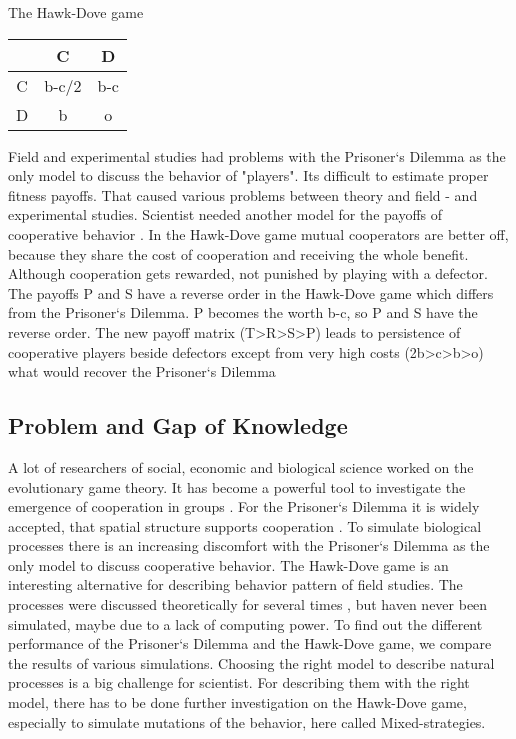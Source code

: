 The Hawk-Dove game

\begin{tabular}{|c|c|c|}
	\hline  & C & D \\ 
	\hline C & b-c/2 & b-c \\ 
	\hline D & b & o \\ 
	\hline 
\end{tabular} 
 
Field and experimental studies had problems with the Prisoner`s Dilemma as the only model to discuss the behavior of "players". Its difficult to estimate proper fitness payoffs. That caused various problems between theory and field -  and experimental studies. Scientist needed another model for the payoffs of cooperative behavior \citep{newmark1996}. In the Hawk-Dove game mutual cooperators are better off, because they share the cost of cooperation and receiving the whole benefit. Although cooperation gets rewarded, not punished by playing with a defector. The payoffs P and S have a reverse order in the Hawk-Dove game which differs from the Prisoner`s Dilemma. P becomes the worth b-c, so P and S have the reverse order. The new payoff matrix (T>R>S>P) leads to persistence of cooperative players beside defectors except from very high costs (2b>c>b>o) what would recover the Prisoner`s Dilemma \citep{HauertandDoebeli2004} 

\subsection{Problem and Gap of Knowledge}
A lot of researchers of social, economic and biological science worked on the evolutionary game theory. It has become a powerful tool to investigate the emergence of cooperation in groups \citep{HauertandDoebeli2004}. For the Prisoner`s Dilemma it is widely accepted, that spatial structure supports cooperation \citep{margules2000}. To simulate biological processes there is an increasing discomfort with the Prisoner`s Dilemma as the only model to discuss cooperative behavior. The Hawk-Dove game is an interesting alternative for describing behavior pattern of field studies\citep{pressey1994}. The processes were discussed theoretically for several times \citep{margules2000, pressey1994}, but haven never been simulated, maybe due to a lack of computing power.  To find out the different performance of  the Prisoner`s Dilemma and  the  Hawk-Dove game, we compare the results of various simulations. Choosing the right model to describe natural processes is a big challenge for scientist. For describing them with the right model, there has to be done further investigation on the Hawk-Dove game, especially to simulate mutations of the behavior, here called Mixed-strategies. 

